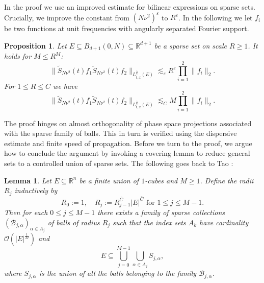\documentclass{amsart}
\numberwithin{equation}{section}
\newtheorem{lemma}[theorem]{Lemma}
\newtheorem{proposition}[theorem]{Proposition}
\theoremstyle{definition}
\newcommand{\R}{\mathbb{R}}
\begin{document}
In the proof we use an improved estimate for bilinear expressions on sparse sets. Crucially, we improve the constant from $(N \nu^2) ^\varepsilon$ to $R^{\varepsilon}$. In the following we let $f_i$ be two functions at unit frequencies with angularly separated Fourier support. 
\begin{proposition}
\label{prop:SparseImprovement}
Let $E \subseteq B_{d+1}(0,N) \subseteq \R^{d+1}$ be a sparse set on scale $R \geq 1$. It holds for $M \leq R^M$:
\begin{equation}
\label{eq:SparseEstimateI}
\| \tilde{S}_{N \nu^2} (t) f_1 \tilde{S}_{N \nu^2}(t) f_2 \|_{L^{\bar{q}}_{t,x}(E)} \lesssim_{\varepsilon} R^\varepsilon  \prod_{i=1}^2 \| f_i \|_2.
\end{equation}
For $1 \leq R \leq C$ we have
\begin{equation}
\label{eq:SparseEstimateII}
    \| \tilde{S}_{N \nu^2}(t) f_1 \tilde{S}_{N \nu^2}(t) f_2 \|_{L^{\bar{q}}_{t,x}(E)} \lesssim_C M \prod_{i=1}^2 \| f_i \|_2.
\end{equation}
\end{proposition}
The proof hinges on almost orthogonality of phase space projections associated with the sparse family of balls. This in turn is verified using the dispersive estimate and finite speed of propagation. Before we turn to the proof, we argue how to conclude the argument by invoking a covering lemma to reduce general sets to a controlled union of sparse sets. The following goes back to Tao \cite{Tao1998,Tao1999}:
\begin{lemma}
Let $E \subseteq \R^n$ be a finite union of $1$-cubes and $M \geq 1$. Define the radii $R_j$ inductively by
\begin{equation*}
R_0 := 1, \quad R_j := R_{j-1}^{\bar{C}} |E|^{\bar{C}} \text{ for } 1 \leq j \leq M-1.
\end{equation*}
Then for each $0 \leq j \leq M-1$ there exists a family of sparse collections $(\mathcal{B}_{j,\alpha})_{\alpha \in A_j}$ of balls of radius $R_j$ such that the index sets $A_k$ have cardinality $\mathcal{O}(|E|^{\frac{1}{M}})$ and
\begin{equation*}
E \subseteq \bigcup_{j=0}^{M-1} \bigcup_{\alpha \in A_j} S_{j,\alpha},
\end{equation*}
where $S_{j,\alpha}$ is the union of all the balls belonging to the family $\mathcal{B}_{j,\alpha}$.
\end{lemma}
\end{document}
